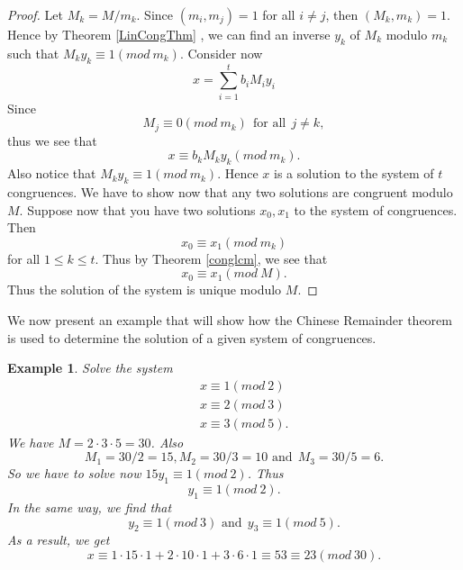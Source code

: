 \documentclass[12pt,letterpaper]{book}
\newtheorem{example}{Example}
\begin{document}
\begin{proof}
Let $M_k=M/m_k$.  Since $(m_i,m_j)=1$ for all $i\neq j$, then
$(M_k,m_k)=1$.  Hence by Theorem \ref{LinCongThm} , we can find an inverse $y_k$
of $M_k$ modulo $m_k$ such that $M_ky_k\equiv 1(mod \ m_k)$.
Consider now
\begin{equation*}
x=\sum_{i=1}^tb_iM_iy_i
\end{equation*}
Since
\begin{equation*}
M_j\equiv 0(mod \ m_k) \ \ \mbox{for all} \ \  j\neq k,
\end{equation*}
thus we see that
\begin{equation*}
x\equiv b_kM_ky_k(mod \ m_k).
\end{equation*}
Also notice that $M_ky_k\equiv 1(mod \ m_k)$.  Hence $x$ is a
solution to the system of $t$ congruences.   We have to show now that
any two solutions are congruent modulo $M$.  Suppose now that you
have two solutions $x_0,x_1$ to the system of congruences.  Then
\begin{equation*}
x_0\equiv x_1(mod \ m_k)
\end{equation*}
for all $1\leq k\leq t$.  Thus by Theorem \ref{conglcm}, we see that
\begin{equation*}
x_0\equiv x_1(mod \ M).
\end{equation*}
Thus the solution of the system is unique modulo $M$.
\end{proof}

We now present an example that will show how the Chinese Remainder
theorem is used to determine the solution of a given system of
congruences.

\begin{example}
Solve the system
\begin{eqnarray*}
&& x\equiv 1(mod \ 2)\\&& x\equiv 2(mod \ 3)\\&& x\equiv 3(mod \ 5).
\end{eqnarray*}
We have $M=2\cdot 3\cdot 5=30$.  Also
\begin{equation*}
M_1=30/2=15, M_2=30/3=10 \mbox{ and} \ \  M_3=30/5=6.
\end{equation*}
So we have to solve now $15y_1\equiv 1(mod \ 2)$. Thus
\begin{equation*}
y_1\equiv 1(mod \ 2).
\end{equation*}
In the same way, we find that
\begin{equation*}
y_2\equiv 1(mod \ 3) \mbox{ and} \ \   y_3\equiv 1(mod \ 5).
\end{equation*}
As a result, we get
\begin{equation*}
x\equiv 1\cdot 15\cdot 1+2\cdot 10\cdot 1+3\cdot 6\cdot 1\equiv 53\equiv 23 (mod \ 30).
\end{equation*}
\end{example}
\end{document}
